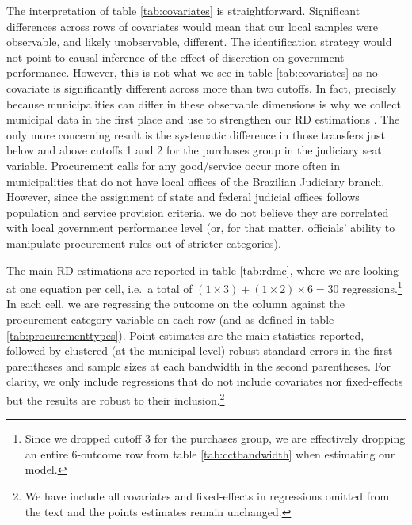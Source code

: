 \documentclass[11pt]{article}
\begin{document}
The interpretation of table \ref{tab:covariates} is straightforward. Significant differences across rows of covariates would mean that our local samples were observable, and likely unobservable, different. The identification strategy would not point to causal inference of the effect of discretion on government performance. However, this is not what we see in table \ref{tab:covariates} as no covariate is significantly different across more than two cutoffs. In fact, precisely because municipalities can differ in these observable dimensions is why we collect municipal data in the first place and use to strengthen our RD estimations \citep{CalonicoRegressionDiscontinuityDesigns2018}. The only more concerning result is the systematic difference in those transfers just below and above cutoffs 1 and 2 for the purchases group in the judiciary seat variable. Procurement calls for any good/service occur more often in municipalities that do not have local offices of the Brazilian Judiciary branch. However, since the assignment of state and federal judicial offices follows population and service provision criteria, we do not believe they are correlated with local government performance level (or, for that matter, officials' ability to manipulate procurement rules out of stricter categories).

The main RD estimations are reported in table \ref{tab:rdmc}, where we are looking at one equation per cell, i.e.~a total of $(1 \times 3) + (1 \times 2) \times 6 = 30$ regressions.\footnote{Since we dropped cutoff 3 for the purchases group, we are effectively dropping an entire 6-outcome row from table \ref{tab:cctbandwidth} when estimating our model.} In each cell, we are regressing the outcome on the column against the procurement category variable on each row (and as defined in table \ref{tab:procurementtypes}). Point estimates are the main statistics reported, followed by clustered (at the municipal level) robust standard errors in the first parentheses and sample sizes at each bandwidth in the second parentheses. For clarity, we only include regressions that do not include covariates nor fixed-effects but the results are robust to their inclusion.\footnote{We have include all covariates and fixed-effects in regressions omitted from the text and the points estimates remain unchanged.}
\end{document}
